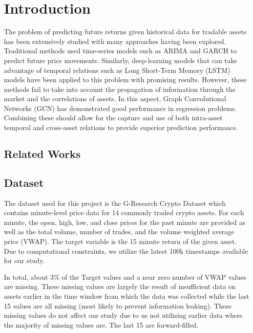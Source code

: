 \section{Introduction}

The problem of predicting future returns given historical data for tradable assets has been extensively studied 
with many approaches having been explored. Traditional methods used time-series models such as ARIMA and GARCH to predict future price movements. Similarly, deep-learning models that can take advantage of temporal relations such as Long Short-Term Memory (LSTM) models have been applied to this problem with promising results. 
However, these methods fail to take into account the propagation of information through the market and the correlations of assets. In this aspect, Graph Convolutional Networks (GCN) has demonstrated good performance in regression problems. Combining these should allow for the capture and use of both intra-asset temporal and cross-asset relations to provide superior prediction performance.

\subsection{Related Works}



\subsection{Dataset}

The dataset used for this project is the G-Research Crypto Dataset which contains minute-level price data for 14 commonly traded crypto assets. For each minute, the open, high, low, and close prices for the past minute are provided as well as the total volume, number of trades, and the volume weighted average price (VWAP). The target variable is the 15 minute return of the given asset. Due to computational constraints, we utilize the latest 100k timestamps available for our study.

In total, about 3\% of the Target values and a near zero number of VWAP values are missing. These missing values are largely the result of insufficient data on assets earlier in the time window from which the data was collected while the last 15 values are all missing (most likely to prevent information leaking). These missing values do not affect our study due to us not utilizing earlier data where the majority of missing values are. The last 15 are forward-filled.

